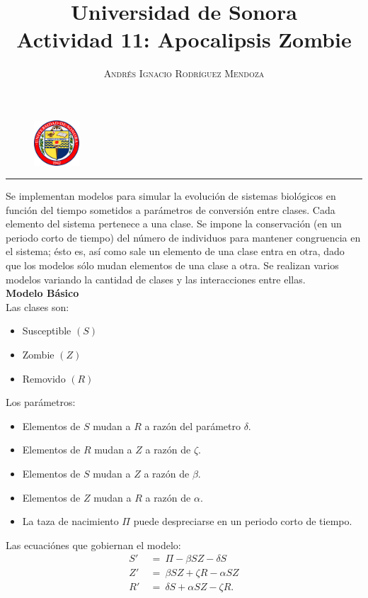\documentclass[11pt,spanish]{article}
\title{\vspace{-3cm} \textbf{\huge Universidad de Sonora} \\ \LARGE Actividad 11: \textbf{Apocalipsis Zombie }}
\author{\textsc{Andrés Ignacio Rodríguez Mendoza}}
\date{}
\begin{document}
\begin{figure}
  \begin{center}
   \vspace{-5.8cm} \includegraphics[width=0.15\textwidth]{uni}
  \end{center}
\end{figure}

\maketitle  
\begin{center}
\rule{\textwidth}{1pt}
\end{center}

Se implementan modelos para simular la evolución de sistemas biológicos en función del tiempo sometidos a parámetros de conversión entre clases. Cada elemento del sistema pertenece a una clase. Se impone la conservación (en un periodo corto de tiempo) del número de individuos para mantener congruencia en el sistema; ésto es, así como sale un elemento de una clase entra en otra, dado que los modelos sólo mudan elementos de una clase a otra.
Se realizan varios modelos variando la cantidad de clases y las interacciones entre ellas.\\

\textbf{Modelo Básico}\\
Las clases son:
\begin{itemize}
\item Susceptible $(S)$
\item Zombie $(Z)$
\item Removido $(R)$
\end{itemize}
Los parámetros:
\begin{itemize}
\item Elementos de $S$ mudan a $R$ a razón del parámetro $\delta$.
\item Elementos de $R$ mudan a $Z$ a razón de $\zeta$.
\item Elementos de $S$ mudan a $Z$ a razón de $\beta$.
\item Elementos de $Z$ mudan a $R$ a razón de $\alpha$.
\item La taza de nacimiento $\Pi$ puede despreciarse en un periodo corto de tiempo.
\end{itemize}
Las ecuaciónes que gobiernan el modelo:
\begin{align*}
S' \ & = \ \Pi - \beta S Z - \delta S\\
Z' \ & = \ \beta S Z + \zeta R - \alpha S Z\\
R' \ & = \ \delta S + \alpha S Z - \zeta R.
\end{align*}
\end{document}
